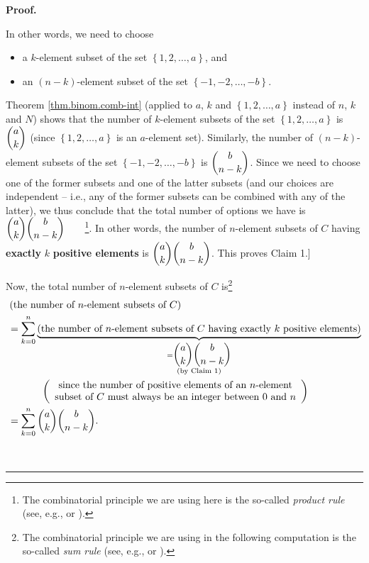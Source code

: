 \documentclass[numbers=enddot,12pt,final,onecolumn,notitlepage]{scrartcl}%
\numberwithin{exer}{subsection}
\theoremstyle{definition}
\newenvironment{proof}[1][Proof]{\noindent\textbf{#1.} }{\ \rule{0.5em}{0.5em}}
\let\sumnonlimits\sum
\renewcommand{\sum}{\sumnonlimits\limits}
\begin{document}
\begin{proof}
\begin{itemize}
In other words, we need to choose

\begin{itemize}
\item a $k$-element subset of the set $\left\{  1,2,\ldots,a\right\}  $, and

\item an $\left(  n-k\right)  $-element subset of the set $\left\{
-1,-2,\ldots,-b\right\}  $.
\end{itemize}

Theorem \ref{thm.binom.comb-int} (applied to $a$, $k$ and $\left\{
1,2,\ldots,a\right\}  $ instead of $n$, $k$ and $N$) shows that the number of
$k$-element subsets of the set $\left\{  1,2,\ldots,a\right\}  $ is
$\dbinom{a}{k}$ (since $\left\{  1,2,\ldots,a\right\}  $ is an $a$-element
set). Similarly, the number of $\left(  n-k\right)  $-element subsets of the
set $\left\{  -1,-2,\ldots,-b\right\}  $ is $\dbinom{b}{n-k}$. Since we need
to choose one of the former subsets and one of the latter subsets (and our
choices are independent -- i.e., any of the former subsets can be combined
with any of the latter), we thus conclude that the total number of options we
have is $\dbinom{a}{k}\dbinom{b}{n-k}$\ \ \ \ \footnote{The combinatorial
principle we are using here is the so-called \textit{product rule} (see, e.g.,
\cite[1.8]{Loehr-BC} or \cite[\S 15.2.1]{LeLeMe}).}. In other words, the
number of $n$-element subsets of $C$ having \textbf{exactly }$k$
\textbf{positive elements} is $\dbinom{a}{k}\dbinom{b}{n-k}$. This proves
Claim 1.]

Now, the total number of $n$-element subsets of $C$ is\footnote{The
combinatorial principle we are using in the following computation is the
so-called \textit{sum rule} (see, e.g., \cite[1.2]{Loehr-BC} or
\cite[\S 15.2.3]{LeLeMe}).}%
\begin{align*}
&  \left(  \text{the number of }n\text{-element subsets of }C\right) \\
&  =\sum_{k=0}^{n}\underbrace{\left(  \text{the number of }n\text{-element
subsets of }C\text{ having exactly }k\text{ positive elements}\right)
}_{\substack{=\dbinom{a}{k}\dbinom{b}{n-k}\\\text{(by Claim 1)}}}\\
&  \ \ \ \ \ \ \ \ \ \ \left(
\begin{array}
[c]{c}%
\text{since the number of positive elements of an }n\text{-element}\\
\text{subset of }C\text{ must always be an integer between }0\text{ and }n
\end{array}
\right) \\
&  =\sum_{k=0}^{n}\dbinom{a}{k}\dbinom{b}{n-k}.
\end{align*}


\end{itemize}
\end{proof}
\end{document}
